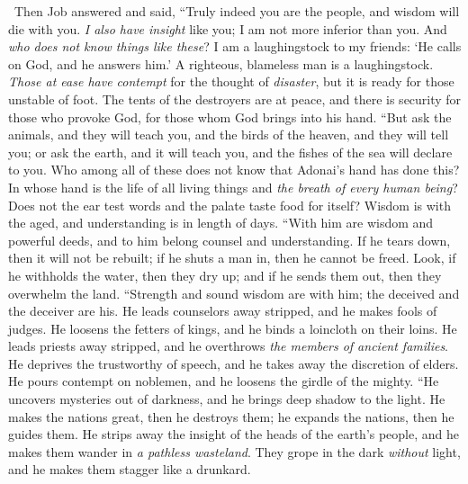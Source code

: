 \begin{biblechapter} %
  Then Job answered and said,
\verse “Truly indeed you are the people, 
and wisdom will die with you.
\verse \textit{I also have insight} like you; 
I am not more inferior than you. 
And \textit{who does not know things like these}?
\verse I am a laughingstock to my friends: 
‘He calls on God, and he answers him.’ 
A righteous, blameless man is a laughingstock.
\verse \textit{Those at ease have contempt} for the thought of \textit{disaster}, 
but it is ready for those unstable of foot.
\verse The tents of the destroyers are at peace, 
and there is security for those who provoke God, 
for those whom God brings into his hand.
\verse “But ask the animals, and they will teach you, 
and the birds of the heaven, and they will tell you;
\verse or ask the earth, and it will teach you, 
and the fishes of the sea will declare to you.
\verse Who among all of these does not know 
that Adonai’s hand has done this?
\verse In whose hand is the life of all living things 
and \textit{the breath of every human being}?
\verse Does not the ear test words 
and the palate taste food for itself?
\verse Wisdom is with the aged, 
and understanding is in length of days.
\verse “With him are wisdom and powerful deeds, 
and to him belong counsel and understanding.
\verse If he tears down, then it will not be rebuilt; 
if he shuts a man in, then he cannot be freed.
\verse Look, if he withholds the water, then they dry up; 
and if he sends them out, then they overwhelm the land.
\verse “Strength and sound wisdom are with him; 
the deceived and the deceiver are his.
\verse He leads counselors away stripped, 
and he makes fools of judges.
\verse He loosens the fetters of kings, 
and he binds a loincloth on their loins.
\verse He leads priests away stripped, 
and he overthrows \textit{the members of ancient families}.
\verse He deprives the trustworthy of speech, 
and he takes away the discretion of elders.
\verse He pours contempt on noblemen, 
and he loosens the girdle of the mighty.
\verse “He uncovers mysteries out of darkness, 
and he brings deep shadow to the light.
\verse He makes the nations great, then he destroys them; 
he expands the nations, then he guides them.
\verse He strips away the insight of the heads of the earth’s people, 
and he makes them wander in \textit{a pathless wasteland}.
\verse They grope in the dark \textit{without} light, 
and he makes them stagger like a drunkard.
\end{biblechapter}

